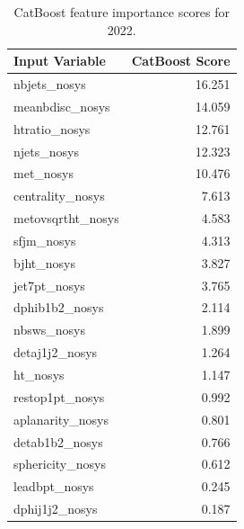 \documentclass[twoside]{article}
\begin{document}
\begin{table}[htbp]
\centering
\begin{tabular}{l r}
\hline
\textbf{Input Variable} & \textbf{CatBoost Score} \\
\hline
nbjets\_nosys        & 16.251 \\
meanbdisc\_nosys     & 14.059 \\
htratio\_nosys       & 12.761 \\
njets\_nosys         & 12.323 \\
met\_nosys           & 10.476 \\
centrality\_nosys    & 7.613  \\
metovsqrtht\_nosys   & 4.583  \\
sfjm\_nosys          & 4.313  \\
bjht\_nosys          & 3.827  \\
jet7pt\_nosys        & 3.765  \\
dphib1b2\_nosys      & 2.114  \\
nbsws\_nosys         & 1.899  \\
detaj1j2\_nosys      & 1.264  \\
ht\_nosys            & 1.147  \\
restop1pt\_nosys     & 0.992  \\
aplanarity\_nosys    & 0.801  \\
detab1b2\_nosys      & 0.766  \\
sphericity\_nosys    & 0.612  \\
leadbpt\_nosys       & 0.245  \\
dphij1j2\_nosys      & 0.187  \\
\hline
\end{tabular}
\caption{CatBoost feature importance scores for 2022.}
\label{tab:catboost_scores_2022}
\end{table}
\end{document}

